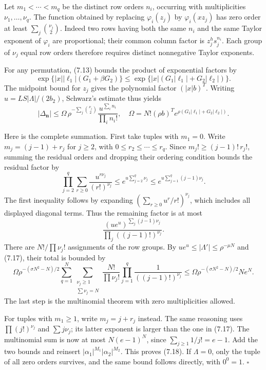 \documentclass[
  11pt,
  a4paper,
]{article}
\begin{document}
Let \(m_1<\cdots<m_q\) be the distinct row orders \(n_i\), occurring
with multiplicities \(\nu_1,\ldots,\nu_q\). The function obtained by
replacing \(\varphi_i(z_j)\) by \(\varphi_i(xz_j)\) has zero order at
least \(\sum_j\binom{\nu_j}{2}\). Indeed two rows having both the same
\(n_i\) and the same Taylor exponent of \(\varphi_i\) are proportional;
their common column factor is \(z_j^h s_j^{n_i}\). Each group of
\(\nu_j\) equal row orders therefore requires distinct nonnegative
Taylor exponents.

For any permutation, (7.13) bounds the product of exponential factors by
\[
\exp\{|x||\ell_1|(G_1+\beta G_2)\}
\le\exp\{|x|(G_1|\ell_1|+G_2|\ell_2|)\}.
\] The midpoint bound for \(z_j\) gives the polynomial factor
\((|x|b)^T\). Writing \(u=LS|\Lambda|/(2b_2)\), Schwarz's estimate thus
yields \[
|\Delta_{\mathbf n}|
\le\Omega\,\rho^{-\sum_j\binom{\nu_j}{2}}
\frac{u^{\sum_i n_i}}{\prod_i n_i!},
\quad
\Omega=N!(\rho b)^T
e^{\rho(G_1|\ell_1|+G_2|\ell_2|)}. \tag{7.19}
\]

Here is the complete summation. First take tuples with \(m_1=0\). Write
\(m_j=(j-1)+r_j\) for \(j\ge2\), with \(0\le r_2\le\cdots\le r_q\).
Since \(m_j!\ge(j-1)!\,r_j!\), summing the residual orders and dropping
their ordering condition bounds the residual factor by \[
\prod_{j=2}^q\sum_{r\ge0}\frac{u^{r\nu_j}}{(r!)^{\nu_j}}
\le e^{u\sum_{j=2}^q\nu_j}
\le e^{u\sum_{j=1}^q(j-1)\nu_j}.
\] The first inequality follows by expanding
\((\sum_{r\ge0}u^r/r!)^{\nu_j}\), which includes all displayed diagonal
terms. Thus the remaining factor is at most \[
\frac{(ue^u)^{\sum_j(j-1)\nu_j}}{\prod_j((j-1)!)^{\nu_j}}.
\] There are \(N!/\prod\nu_j!\) assignments of the row groups. By
\(ue^u\le|\Lambda'|\le\rho^{-\mu N}\) and (7.17), their total is bounded
by \[
\Omega\rho^{-(\sigma N^2-N)/2}
\sum_{q=1}^N
\sum_{\substack{\nu_j\ge1\\\sum\nu_j=N}}
\frac{N!}{\prod\nu_j!}\prod_{j=1}^q\frac1{((j-1)!)^{\nu_j}}
\le\Omega\rho^{-(\sigma N^2-N)/2}Ne^N.
\] The last step is the multinomial theorem with zero multiplicities
allowed.

For tuples with \(m_1\ge1\), write \(m_j=j+r_j\) instead. The same
reasoning uses \(\prod(j!)^{\nu_j}\) and \(\sum j\nu_j\); its latter
exponent is larger than the one in (7.17). The multinomial sum is now at
most \(N(e-1)^N\), since \(\sum_{j\ge1}1/j!=e-1\). Add the two bounds
and reinsert \(|\alpha_1|^{M_1}|\alpha_2|^{M_2}\). This proves (7.18).
If \(\Lambda=0\), only the tuple of all zero orders survives, and the
same bound follows directly, with \(0^0=1\). \(\square\)
\end{document}
